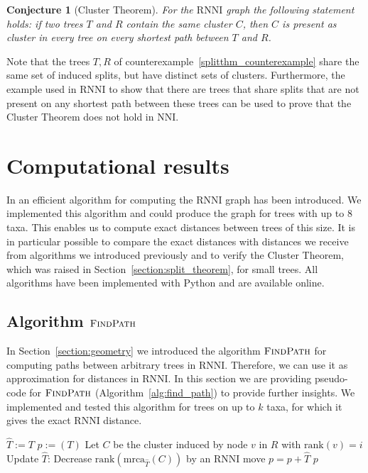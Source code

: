 \documentclass{amsart}
\newcommand{\mrca}{\mathrm{mrca}}
\newcommand{\rank}{\mathrm{rank}}
\newcommand{\nni}{\mathrm{NNI}}
\newcommand{\rnni}{\mathrm{RNNI}}
\newcommand{\findpath}{\textsc{FindPath}}
\newtheorem{conjecture}[definition]{Conjecture}
\begin{document}
\begin{conjecture}[Cluster Theorem]
	For the $\rnni$ graph the following statement holds:
	if two trees $T$ and $R$ contain the same cluster $C$, then $C$ is present as cluster in every tree on every shortest path between $T$ and $R$.
	\label{conjecture:cluster_theorem}
\end{conjecture}

Note that the trees $T, R$ of counterexample~\ref{splitthm_counterexample} share the same set of induced splits, but have distinct sets of clusters.
Furthermore, the example used in $\rnni$ to show that there are trees that share splits that are not present on any shortest path between these trees can be used to prove that the Cluster Theorem does not hold in $\nni$.

\section{Computational results}
\label{section:computation}

In \autocite{Gavryushkin2017} an efficient algorithm for computing the $\rnni$ graph has been introduced.
We implemented this algorithm and could produce the graph for trees with up to $8$ taxa.
This enables us to compute exact distances between trees of this size.
It is in particular possible to compare the exact distances with distances we receive from algorithms we introduced previously and to verify the Cluster Theorem, which was raised in Section~\ref{section:split_theorem}, for small trees.
All algorithms have been implemented with Python and are available online. 

\subsection{Algorithm $\findpath$}
\label{section:computation_findpath}

In Section~\ref{section:geometry} we introduced the algorithm $\findpath$ for computing paths between arbitrary trees in $\rnni$.
Therefore, we can use it as approximation for distances in $\rnni$.
In this section we are providing pseudo-code for $\findpath$ (Algorithm~\ref{alg:find_path}) to provide further insights.
We implemented and tested this algorithm for trees on up to $k$ taxa, for which it gives the exact $\rnni$ distance. 

\begin{algorithm}[H]
\caption{$\findpath$($T,R$)}
\label{alg:find_path}
\begin{algorithmic}[1]
	\STATE $\hat{T} := T$
	\STATE $p := (T)$
		\STATE Let $C$ be the cluster induced by node $v$ in $R$ with $\rank(v) = i$
		\WHILE {$\rank(\mrca_{\hat{T}}(C))>i$}
			\STATE Update $\hat{T}$: Decrease $\rank(\mrca_{\hat{T}}(C))$ by an $\rnni$ move \label{alg:line:move_set_down}
			\STATE $p = p+\hat{T}$
		\ENDWHILE
	\ENDFOR
	\RETURN $p$
\end{algorithmic}
\end{algorithm}
\end{document}
